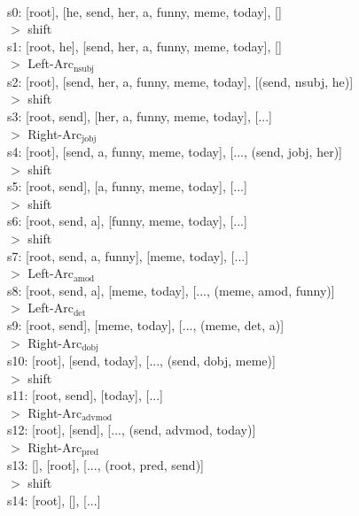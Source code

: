 \documentclass[twoside,11pt]{homework}
\begin{document}
\begin{solution}
  \ \\
  s0: [root], [he, send, her, a, funny, meme, today], []\\
  $>$ shift\\
  s1: [root, he], [send, her, a, funny, meme, today], []\\
  $>$ Left-Arc$_{\text{nsubj}}$\\
  s2: [root], [send, her, a, funny, meme, today], [(send, nsubj, he)]\\
  $>$ shift\\
  s3: [root, send], [her, a, funny, meme, today], [...]\\
  $>$ Right-Arc$_{\text{jobj}}$\\
  s4: [root], [send, a, funny, meme, today], [..., (send, jobj, her)]\\
  $>$ shift\\
  s5: [root, send], [a, funny, meme, today], [...]\\
  $>$ shift\\
  s6: [root, send, a], [funny, meme, today], [...]\\
  $>$ shift\\
  s7: [root, send, a, funny], [meme, today], [...]\\
  $>$ Left-Arc$_{\text{amod}}$\\
  s8: [root, send, a], [meme, today], [..., (meme, amod, funny)]\\
  $>$ Left-Arc$_{\text{det}}$\\
  s9: [root, send], [meme, today], [..., (meme, det, a)]\\
  $>$ Right-Arc$_{\text{dobj}}$\\
  s10: [root], [send, today], [..., (send, dobj, meme)]\\
  $>$ shift\\
  s11: [root, send], [today], [...]\\
  $>$ Right-Arc$_{\text{advmod}}$\\
  s12: [root], [send], [..., (send, advmod, today)]\\
  $>$ Right-Arc$_{\text{pred}}$\\
  s13: [], [root], [..., (root, pred, send)]\\
  $>$ shift\\
  s14: [root], [], [...]\\
  
\end{solution}
\end{document}

